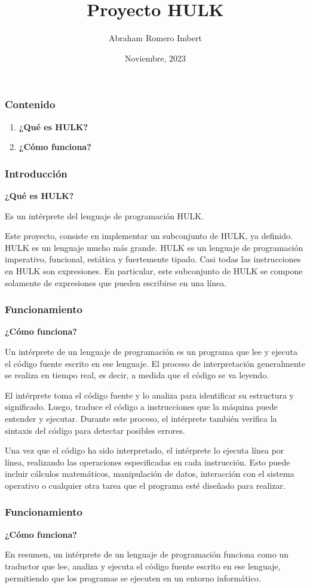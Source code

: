 \documentclass{beamer}
\title{Proyecto HULK}
\subtitle{}
\institute{Facultad de Matemática y Computación\\Universidad de la Habana}
\author{Abraham Romero Imbert}
\date{Noviembre, 2023}
\begin{document}
\maketitle

\begin{frame}
  \frametitle{Contenido}
  \begin{enumerate}
    \item \Huge\textbf{¿Qué es HULK?}
    \item  \Huge\textbf{¿Cómo funciona?}
  \end{enumerate}
\end{frame}

\begin{frame}
  \frametitle{ Introducción}
\begin{center}
  \LARGE\textbf{¿Qué es HULK?}
\end{center}

Es un intérprete del lenguaje de programación HULK.

Este proyecto, consiste en implementar un subconjunto de HULK, ya definido. HULK es un lenguaje mucho más grande.
HULK es un lenguaje de programación imperativo, funcional, estática y fuertemente tipado. Casi todas las instrucciones en HULK son expresiones. En particular, este subconjunto de HULK se compone solamente de expresiones que pueden escribirse en una línea.
\end{frame}

\begin{frame}
\frametitle{Funcionamiento}
\begin{center}
  \LARGE\textbf{¿Cómo funciona?}
\end{center}
Un intérprete de un lenguaje de programación es un programa que lee y ejecuta el código fuente escrito en ese lenguaje. El proceso de interpretación generalmente se realiza en tiempo real, es decir, a medida que el código se va leyendo.

El intérprete toma el código fuente y lo analiza para identificar su estructura y significado. Luego, traduce el código a instrucciones que la máquina puede entender y ejecutar. Durante este proceso, el intérprete también verifica la sintaxis del código para detectar posibles errores.

Una vez que el código ha sido interpretado, el intérprete lo ejecuta línea por línea, realizando las operaciones especificadas en cada instrucción. Esto puede incluir cálculos matemáticos, manipulación de datos, interacción con el sistema operativo o cualquier otra tarea que el programa esté diseñado para realizar.
\end{frame}
\begin{frame}
    \frametitle{Funcionamiento}
    \begin{center}
      \LARGE\textbf{¿Cómo funciona?}
    \end{center}
    En resumen, un intérprete de un lenguaje de programación funciona como un traductor que lee, analiza y ejecuta el código fuente escrito en ese lenguaje, permitiendo que los programas se ejecuten en un entorno informático.
    \end{frame}
\end{document}
